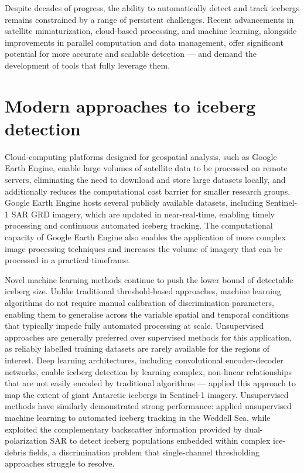 \documentclass[11pt, letterpaper]{article}
\begin{document}
Despite decades of progress, the ability to automatically detect and track 
icebergs remains constrained by a range of persistent challenges. Recent 
advancements in satellite miniaturization, cloud-based processing, and machine 
learning, alongside improvements in parallel computation and data management, 
offer significant potential for more accurate and scalable detection --- and 
demand the development of tools that fully leverage them.~\parencite{koo2021}

\section{Modern approaches to iceberg detection}

Cloud-computing platforms designed for geospatial analysis, such as Google Earth Engine, enable large volumes of satellite data to be processed on remote servers, eliminating the need to download and store large datasets locally, and additionally reduces the computational cost barrier for smaller research groups. Google Earth Engine hosts several publicly available datasets, including Sentinel-1 SAR GRD imagery, which are updated in near-real-time, enabling timely processing and continuous automated iceberg tracking. The computational capacity of Google Earth Engine also enables the application of more complex image processing techniques and increases the volume of imagery that can be processed in a practical timeframe.~\parencite{koo2021, koo2023}

Novel machine learning methods continue to push the lower bound of detectable 
iceberg size. Unlike traditional threshold-based approaches, machine learning 
algorithms do not require manual calibration of discrimination parameters, 
enabling them to generalise across the variable spatial and temporal conditions 
that typically impede fully automated processing at scale. Unsupervised 
approaches are generally preferred over supervised methods for this application, 
as reliably labelled training datasets are rarely available for the regions of interest. Deep learning architectures, including convolutional encoder-decoder networks, enable iceberg detection by learning complex, non-linear relationships that are not easily encoded by traditional algorithms --- \textcite{braakmann_folgmann_etal_2023} applied this approach to map the extent of giant Antarctic icebergs in Sentinel-1 imagery. Unsupervised methods have similarly demonstrated strong performance: \textcite{barbat_etal_2021} applied unsupervised machine learning to automated iceberg tracking in the Weddell Sea, while \textcite{evans_etal_2023} exploited the complementary backscatter information provided by dual-polarization SAR to detect iceberg populations embedded within complex ice-debris fields, a discrimination problem that single-channel thresholding approaches struggle to resolve.
\end{document}

